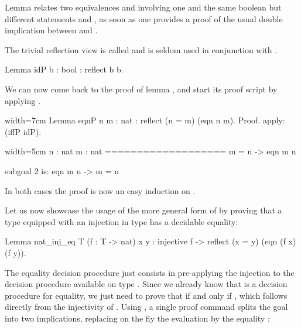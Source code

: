 Lemma  relates two equivalences 
and  involving one and the same boolean 
but different  statements  and , as soon as one
provides a proof of the usual double implication between  and
.

The trivial reflection view is called  and is seldom used
in conjunction with .

\begin{coq}{}{}
Lemma idP {b : bool} : reflect b b.
\end{coq}
We can now come back to the proof of lemma , and start its
proof script by applying .

\begin{coq-left}{}{width=7cm}
Lemma eqnP {n m : nat} :
  reflect (n = m) (eqn n m).
Proof.
apply: (iffP idP).
$~$
$~$
$~$
\end{coq-left}
\begin{coqout-right}{}{width=5cm}
n : nat
m : nat
===================
 m = n -> eqn m n

subgoal 2 is:
 eqn m n -> m = n
\end{coqout-right}

In both cases the proof is now an easy induction on .

Let us now
showcase the usage of the more general form of  by proving
that a type equipped with an injection in type  has a
decidable equality:

\begin{coq}{}{}
Lemma nat_inj_eq T (f : T -> nat) x y :
  injective f -> reflect (x = y) (eqn (f x) (f y)).
\end{coq}

The equality decision procedure just consists in pre-applying
the injection  to the decision procedure  available on
type . Since we already know that  is a decision
procedure for equality, we just need to prove that  if and
only if , which  follows directly from the injectivity of
. Using , a single proof command splits the goal into two
implications, replacing on the fly the evaluation
 by the  equality :

